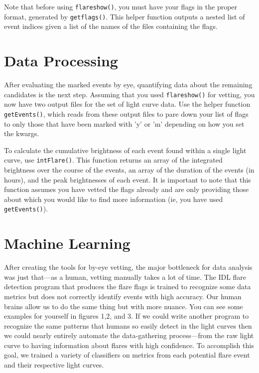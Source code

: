 \documentclass[11pt]{article}
\begin{document}
Note that before using \verb|flareshow()|, you must have your flags in
the proper format, generated by \verb|getflags()|.  This helper
function outputs a nested list of event indices given a list of the
names of the files containing the flags.

\section{Data Processing}
\label{sec:advanced}

After evaluating the marked events by eye, quantifying data about the
remaining candidates is the next step.  Assuming that you used
\verb|flareshow()| for vetting, you now have two output files for the
set of light curve data.  Use the helper function \verb|getEvents()|,
which reads from these output files to pare down your list of flags to
only those that have been marked with 'y' or 'm' depending on how you
set the kwargs.

To calculate the cumulative brightness of each event found within a
single light curve, use \verb|intFlare()|.  This function returns an
array of the integrated brightness over the course of the events, an
array of the duration of the events (in hours), and the peak
brightnesses of each event.  It is important to note that this
function assumes you have vetted the flags already and are only
providing those about which you would like to find more information
(ie, you have used \verb|getEvents()|).


\section{Machine Learning}
\label{sec:ml}

After creating the tools for by-eye vetting, the major bottleneck for
data analysis was just that---as a human, vetting manually takes a lot
of time.  The IDL flare detection program that produces the flare
flags is trained to recognize some data metrics but does not correctly
identify events with high accuracy.  Our human brains allow us to do
the same thing but with more nuance.  You can see some examples for
yourself in figures 1,2, and 3.  If we could write another
program to recognize the same patterns that humans so easily detect in
the light curves then we could nearly entirely automate the
data-gathering process---from the raw light curve to having
information about flares with high confidence.  To accomplish this
goal, we trained a variety of classifiers on metrics from each
potential flare event and their respective light curves.
\end{document}
